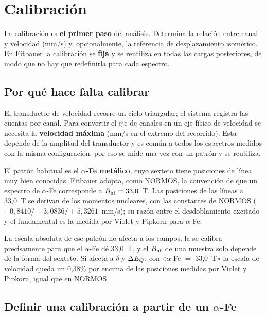 \chapter{Calibración}
\label{ch:calibracion}

La calibración es \textbf{el primer paso} del análisis. Determina la relación
entre canal y velocidad (mm/s) y, opcionalmente, la referencia de desplazamiento
isomérico. En Fitbauer la calibración se \textbf{fija} y se reutiliza en todas
las cargas posteriores, de modo que no hay que redefinirla para cada espectro.

\section{Por qué hace falta calibrar}

El transductor de velocidad recorre un ciclo triangular; el sistema registra las
cuentas por canal. Para convertir el eje de canales en un eje físico de
velocidad se necesita la \textbf{velocidad máxima}  (mm/s en el
extremo del recorrido). Esta  depende de la amplitud del transductor
y es común a todos los espectros medidos con la misma configuración: por eso se
mide una vez con un patrón y se reutiliza.

El patrón habitual es el \textbf{$\alpha$-Fe metálico}, cuyo sexteto tiene
posiciones de línea muy bien conocidas. Fitbauer adopta, como NORMOS, la
convención de que un espectro de $\alpha$-Fe corresponde a $B_{\mathrm{hf}} = 33{,}0$~T. Las
posiciones de las líneas a 33{,}0~T se derivan de los momentos nucleares, con las
constantes de NORMOS ($\pm0{,}8410 / \pm3{,}0836 / \pm5{,}3261$~mm/s); su razón
entre el desdoblamiento excitado y el fundamental es la medida por Violet y
Pipkorn para $\alpha$-Fe.

\begin{nota}
La escala absoluta de ese patrón no afecta a los campos: la  se
calibra precisamente para que el $\alpha$-Fe dé 33{,}0~T, y el $B_{\mathrm{hf}}$ de una
muestra solo depende de la forma del sexteto. Sí afecta a $\delta$ y $\Delta E_{Q}$:
con «$\alpha$-Fe $=$ 33{,}0~T» la escala de velocidad queda un 0{,}38\% por
encima de las posiciones medidas por Violet y Pipkorn, igual que en NORMOS.
\end{nota}

\section{Definir una calibración a partir de un $\alpha$-Fe}
\label{sec:definir-calib}

